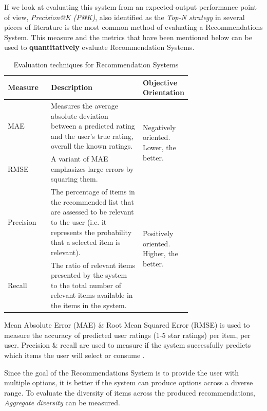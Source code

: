 \documentclass[manuscript,screen,review]{acmart}
\begin{document}
If we look at evaluating this system from an expected-output performance point of view, \textit{Precision@K (P@K)}, also identified as the \textit{Top-N strategy} in several pieces of literature is the most common method of evaluating a Recommendations System.
This measure and the metrics that have been mentioned below can be used to \textbf{quantitatively} evaluate Recommendation Systems.

\begin{table}[h]
\caption{Evaluation techniques for Recommendation Systems}
\label{tab:evaluation-techniques-table}
\centering
\begin{tabular}{|l|p{0.5\linewidth}|p{0.21\linewidth}|} 
\hline
Measure & Description & Objective Orientation \\ 
\hline
MAE & Measures the average absolute deviation between a predicted rating and the user’s true rating, overall the known ratings. & \multirow{2}{=}{Negatively oriented. Lower, the better.} \\ 
\cline{1-2}
RMSE & A variant of MAE emphasizes large errors by squaring them. &  \\ 
\hline
Precision & The percentage of items in the recommended list that are assessed to be relevant to the user (i.e. it represents the probability that a selected item is relevant). & \multirow{2}{=}{Positively oriented. Higher, the better.} \\ 
\cline{1-2}
Recall & The ratio of relevant items presented by the system to the total number of relevant items available in the items in the system. &  \\
\hline
\end{tabular}
\end{table}

Mean Absolute Error (MAE) \& Root Mean Squared Error (RMSE) is used to measure the accuracy of predicted user ratings (1-5 star ratings) per item, per user. Precision \& recall are used to measure if the system successfully predicts which items the user will select or consume \cite{dayan_recommenders_2011}.


Since the goal of the Recommendations System is to provide the user with multiple options, it is better if the system can produce options across a diverse range. To evaluate the diversity of items across the produced recommendations, \textit{Aggregate diversity} can be measured.
\end{document}
